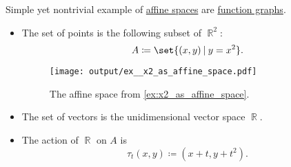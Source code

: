 \begin{example}\label{ex:x2_as_affine_space}
  Simple yet nontrivial example of \hyperref[def:affine_space]{affine spaces} are \hyperref[def:multi_valued_function/graph]{function graphs}.
  \begin{itemize}
    \item The set of points is the following subset of \( \BbbR^2 \):
    \begin{equation*}
      A \coloneqq \set{ (x, y) \given y = x^2 }.
    \end{equation*}

    \begin{figure}[!ht]
      \centering
      \texttt{[image: output/ex\_\_x2\_as\_affine\_space.pdf]}
      \caption{The affine space from \cref{ex:x2_as_affine_space}.}\label{fig:ex:x2_as_affine_space}
    \end{figure}

    \item The set of vectors is the unidimensional vector space \( \BbbR \).

    \item The action of \( \BbbR \) on \( A \) is
    \begin{equation*}
      \tau_t(x, y) \coloneqq (x + t, y + t^2).
    \end{equation*}
  \end{itemize}
\end{example}

